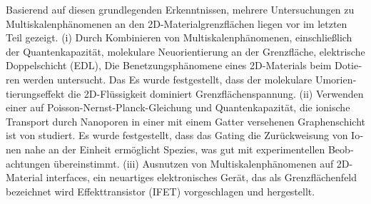 \begin{otherlanguage}{ngerman}
Basierend auf diesen grundlegenden Erkenntnissen, mehrere
Untersuchungen zu Multiskalenphänomenen an den 2D-Materialgrenzflächen liegen vor
im letzten Teil gezeigt.
%
(i) Durch Kombinieren von Multiskalenphänomenen, einschließlich der Quantenkapazität,
molekulare Neuorientierung an der Grenzfläche, elektrische Doppelschicht (EDL),
Die Benetzungsphänomene eines 2D-Materials beim Dotieren werden untersucht. Das
Es wurde festgestellt, dass der molekulare Umorientierungseffekt die 2D-Flüssigkeit dominiert
Grenzflächenspannung.
%
(ii) Verwenden einer auf
Poisson-Nernst-Planck-Gleichung und Quantenkapazität, die ionische
Transport durch Nanoporen in einer mit einem Gatter versehenen Graphenschicht ist
von studiert. Es wurde festgestellt, dass das Gating die Zurückweisung von Ionen nahe an der Einheit ermöglicht
Spezies, was gut mit experimentellen Beobachtungen übereinstimmt.
%
(iii) Ausnutzen von Multiskalenphänomenen auf 2D-Material
interfaces, ein neuartiges elektronisches Gerät, das als Grenzflächenfeld bezeichnet wird
Effekttransistor (IFET) vorgeschlagen und hergestellt.

\end{otherlanguage}

\endgroup

\vfill